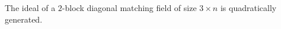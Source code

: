 \begin{theo}\label{Theorem:2block}
The ideal of a $2$-block diagonal matching field of size $3 \times n$ is quadratically generated. 
\end{theo}
